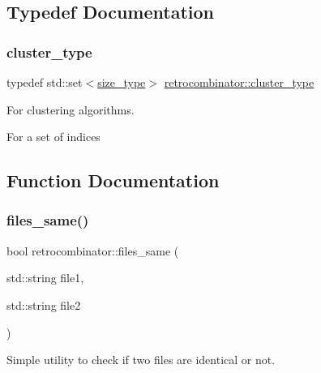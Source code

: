 \subsection{Typedef Documentation}
\mbox{\label{namespaceretrocombinator_a316667a6633d664fe892bd7e0eb0141e}} 
\subsubsection{\texorpdfstring{cluster\+\_\+type}{cluster\_type}}
{\footnotesize\ttfamily typedef std\+::set$<$\hyperlink{namespaceretrocombinator_a8e1541b50cee66a791df4c437ccbb385}{size\+\_\+type}$>$ \hyperlink{namespaceretrocombinator_a316667a6633d664fe892bd7e0eb0141e}{retrocombinator\+::cluster\+\_\+type}}



For clustering algorithms. 

For a set of indices 

\subsection{Function Documentation}
\mbox{\label{namespaceretrocombinator_aadb27262663ae58fda77172ae3d828dc}} 
\subsubsection{\texorpdfstring{files\+\_\+same()}{files\_same()}}
{\footnotesize\ttfamily bool retrocombinator\+::files\+\_\+same (\begin{DoxyParamCaption}\item[{std\+::string}]{file1,  }\item[{std\+::string}]{file2 }\end{DoxyParamCaption})}



Simple utility to check if two files are identical or not. 

